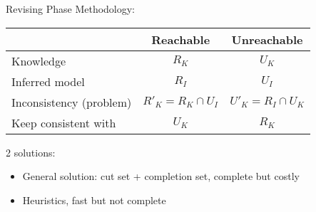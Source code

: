 \documentclass[8pt]{beamer}
\begin{document}
\begin{frame}{Revising Phase}
    Methodology:
    
    \begin{center}
        \begin{tabular}{l|c|c}
        &Reachable &Unreachable\\
        \hline
        Knowledge& $R_K$ & $U_K$ \pause\\
        \hline
        Inferred model& $R_I$ & $U_I$\pause\\
        \hline
        Inconsistency (problem)& $R'_K=R_K\cap U_I$ & $U'_K=R_I\cap U_K$\pause\\
        Keep consistent with& $U_K$& $R_K$ \pause
    \end{tabular} 
    \end{center}
2 solutions:
\begin{itemize}
    \item General solution: cut set + completion set, complete but costly
    \item Heuristics, fast but not complete
\end{itemize}
\end{frame}
\end{document}
